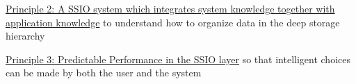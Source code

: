 \underline{Principle 2: A SSIO system which integrates system knowledge together with application knowledge} to understand
how to organize data in the deep storage hierarchy

\underline{Principle 3: Predictable Performance in the SSIO layer} so that intelligent choices can be made by both the user and the system



% 

% 

% 
% 





% 


% 



